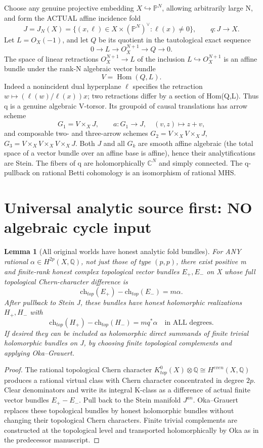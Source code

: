 \documentclass[11pt]{article}
\newtheorem{lemma}[theorem]{Lemma}
\begin{document}
Choose any genuine projective embedding
$X\hookrightarrow\mathbb P^N$, allowing arbitrarily
large N, and form the ACTUAL affine incidence fold
\[
 J=J_N(X)=\{(x,\ell)\in
 X\times(\mathbb P^N)^\vee:\ell(x)\ne0\},
 \qquad q:J\longrightarrow X.
 \tag{1}
\]
Let $L=O_X(-1)$, and let $Q$ be its quotient
in the tautological exact sequence
\[
 0\to L\to O_X^{N+1}\to Q\to0.
 \tag{2}
\]
The space of linear retractions
$O_X^{N+1}\to L$ of the inclusion
$L\hookrightarrow O_X^{N+1}$
is an affine bundle under the rank-N
algebraic vector bundle
\[
 \boxed{V=\operatorname{Hom}(Q,L).}           \tag{3}
\]
Indeed a nonincident dual hyperplane $\ell$
specifies the retraction
$w\mapsto(\ell(w)/\ell(x))x$; two retractions
differ by a section of Hom(Q,L).
Thus q is a genuine algebraic V-torsor.
Its groupoid of causal translations has arrow scheme
\[
 G_1=V\times_X J,\qquad
 a:G_1\to J,\quad(v,z)\mapsto z+v,
 \tag{4}
\]
and composable two- and three-arrow schemes
$G_2=V\times_XV\times_XJ$,
$G_3=V\times_XV\times_XV\times_XJ$.
Both $J$ and all $G_k$ are smooth affine
algebraic (the total space of a vector
bundle over an affine base is affine),
hence their analytifications are Stein.
The fibers of q are holomorphically
$\mathbb C^N$ and simply connected.
The q-pullback on rational Betti cohomology
is an isomorphism of rational MHS.

\section{Universal analytic source first: NO algebraic cycle input}
\begin{lemma}[All original worlds have honest analytic fold bundles]
For ANY rational $\alpha\in H^{2p}(X,\mathbb Q)$,
not just those of type $(p,p)$,
there exist positive m and finite-rank honest
complex topological vector bundles $E_+,E_-$ on X
whose full topological Chern-character difference is
\[
 \mathrm{ch}_{top}(E_+)-\mathrm{ch}_{top}(E_-)
   =m\alpha.
 \tag{5}
\]
After pullback to Stein J, these bundles have honest
holomorphic realizations $H_+,H_-$ with
\[
 \mathrm{ch}_{top}(H_+)-\mathrm{ch}_{top}(H_-)
   =m q^*\alpha\quad\text{in ALL degrees}.
 \tag{6}
\]
If desired they can be included as holomorphic
direct summands of finite trivial holomorphic bundles
on J, by choosing finite topological complements and
applying Oka--Grauert.
\end{lemma}
\begin{proof}
The rational topological Chern character
$K^0_{top}(X)\otimes\mathbb Q
 \cong H^{even}(X,\mathbb Q)$
produces a rational virtual class with
Chern character concentrated in degree $2p$.
Clear denominators and write its integral K-class
as a difference of actual finite vector bundles
$E_+-E_-$. Pull back to the Stein manifold
$J^{an}$. Oka--Grauert replaces these
topological bundles by honest holomorphic bundles
without changing their topological Chern characters.
Finite trivial complements are constructed at the
topological level and transported holomorphically
by Oka as in the predecessor manuscript.
\end{proof}
\end{document}
